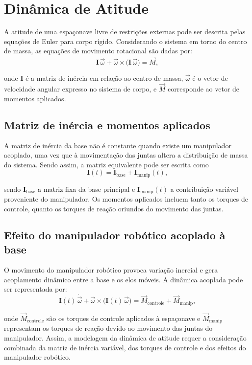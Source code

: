 \section{Dinâmica de Atitude}
A atitude de uma espaçonave livre de restrições externas pode ser descrita pelas equações de Euler para corpo rígido.
Considerando o sistema em torno do centro de massa, as equações de movimento rotacional são dadas por:
\begin{equation}
\mathbf{I}\,\dot{\vec{\omega}} + \vec{\omega} \times \big(\mathbf{I}\,\vec{\omega}\big) = \vec{M},
\label{eq:euler_rigidbody}
\end{equation}

onde $\mathbf{I}$ é a matriz de inércia em relação ao centro de massa, $\vec{\omega}$ é o vetor de velocidade angular expresso no sistema de corpo, e $\vec{M}$ corresponde ao vetor de momentos aplicados.

\subsection{Matriz de inércia e momentos aplicados}
A matriz de inércia da base não é constante quando existe um manipulador acoplado, uma vez que à movimentação das juntas altera a distribuição de massa do sistema.
Sendo assim, a matriz equivalente pode ser escrita como
\begin{equation}
\mathbf{I}(t) = \mathbf{I}_{\text{base}} + \mathbf{I}_{\text{manip}}(t),
\label{eq:inercia_total}
\end{equation}

sendo $\mathbf{I}_{\text{base}}$ a matriz fixa da base principal e $\mathbf{I}_{\text{manip}}(t)$ a contribuição variável proveniente do manipulador.  
Os momentos aplicados incluem tanto os torques de controle, quanto os torques de reação oriundos do movimento das juntas.

\subsection{Efeito do manipulador robótico acoplado à base}
O movimento do manipulador robótico provoca variação inercial e gera acoplamento dinâmico entre a base e os elos móveis.
A dinâmica acoplada pode ser representada por:
\begin{equation}
\mathbf{I}(t)\,\dot{\vec{\omega}} + \vec{\omega} \times \big(\mathbf{I}(t)\,\vec{\omega}\big) = \vec{M}_{\text{controle}} + \vec{M}_{\text{manip}},
\label{eq:dinamica_acoplada}
\end{equation}

onde $\vec{M}_{\text{controle}}$ são os torques de controle aplicados à espaçonave e $\vec{M}_{\text{manip}}$ representam os torques de reação devido ao movimento das juntas do manipulador. Assim, a modelagem da dinâmica de atitude requer a consideração combinada da matriz de inércia variável, dos torques de controle e dos efeitos do manipulador robótico.
